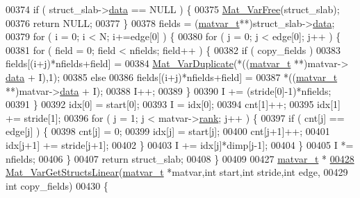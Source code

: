 \begin{DoxyCode}
00374     \textcolor{keywordflow}{if} ( struct\_slab->\hyperlink{group___m_a_t_a5672978efa230bbdecdf38ede781f7fa}{data} == NULL ) \{
00375         \hyperlink{group___m_a_t_ga1d14716f7450530fd1c9d02413787f0e}{Mat\_VarFree}(struct\_slab);
00376         \textcolor{keywordflow}{return} NULL;
00377     \}
00378     fields = (\hyperlink{group___m_a_t_structmatvar__t}{matvar\_t}**)struct\_slab->\hyperlink{group___m_a_t_a5672978efa230bbdecdf38ede781f7fa}{data};
00379     for ( i = 0; i < N; i+=edge[0] ) \{
00380         \textcolor{keywordflow}{for} ( j = 0; j < edge[0]; j++ ) \{
00381             \textcolor{keywordflow}{for} ( field = 0; field < nfields; field++ ) \{
00382                 \textcolor{keywordflow}{if} ( copy\_fields )
00383                     fields[(i+j)*nfields+field] =
00384                          \hyperlink{group___m_a_t_ga7ef80c5d99d7918b2b09db3bea106ecc}{Mat\_VarDuplicate}(*((\hyperlink{group___m_a_t_structmatvar__t}{matvar\_t} **)matvar->
      \hyperlink{group___m_a_t_a5672978efa230bbdecdf38ede781f7fa}{data} + I),1);
00385                 \textcolor{keywordflow}{else}
00386                     fields[(i+j)*nfields+field] =
00387                         *((\hyperlink{group___m_a_t_structmatvar__t}{matvar\_t} **)matvar->\hyperlink{group___m_a_t_a5672978efa230bbdecdf38ede781f7fa}{data} + I);
00388                 I++;
00389             \}
00390             I += (stride[0]-1)*nfields;
00391         \}
00392         idx[0] = start[0];
00393         I = idx[0];
00394         cnt[1]++;
00395         idx[1] += stride[1];
00396         \textcolor{keywordflow}{for} ( j = 1; j < matvar->\hyperlink{group___m_a_t_a84ba70c96ded13cc555fa75b768d9921}{rank}; j++ ) \{
00397             \textcolor{keywordflow}{if} ( cnt[j] == edge[j] ) \{
00398                 cnt[j] = 0;
00399                 idx[j] = start[j];
00400                 cnt[j+1]++;
00401                 idx[j+1] += stride[j+1];
00402             \}
00403             I += idx[j]*dimp[j-1];
00404         \}
00405         I *= nfields;
00406     \}
00407     \textcolor{keywordflow}{return} struct\_slab;
00408 \}
00409 
00427 \hyperlink{group___m_a_t_structmatvar__t}{matvar\_t} *
\hyperlink{group___m_a_t_gaa56680fb7b2cd3d410f659e945da8141}{00428} \hyperlink{group___m_a_t_gaa56680fb7b2cd3d410f659e945da8141}{Mat\_VarGetStructsLinear}(\hyperlink{group___m_a_t_structmatvar__t}{matvar\_t} *matvar,\textcolor{keywordtype}{int} start,\textcolor{keywordtype}{int} stride,\textcolor{keywordtype}{int} edge,
00429     \textcolor{keywordtype}{int} copy\_fields)
00430 \{

\end{DoxyCode}
